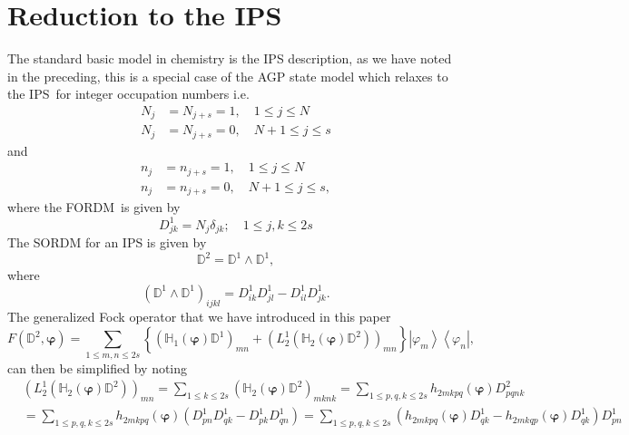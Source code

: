 \documentclass[aps,preprint]{revtex4}%
\begin{document}
\section{Reduction to the IPS \label{IPS}}

The standard basic model in chemistry is the IPS description, as we have noted
in the preceding, this is a special case of the AGP state model which relaxes
to the IPS\ for integer occupation numbers i.e.
\begin{align}
N_{j}  &  =N_{j+s}=1,\quad1\leq j\leq N\nonumber\\
N_{j}  &  =N_{j+s}=0,\quad N+1\leq j\leq s
\end{align}
and%
\begin{align}
n_{j}  &  =n_{j+s}=1,\quad1\leq j\leq N\nonumber\\
n_{j}  &  =n_{j+s}=0,\quad N+1\leq j\leq s,
\end{align}
where the FORDM\ is given by
\begin{equation}
D_{jk}^{1}=N_{j}\delta_{jk};\quad1\leq j,k\leq2s
\end{equation}
The SORDM for an IPS is given by
\begin{equation}
\mathbb{D}^{2}=\mathbb{D}^{1}\wedge\mathbb{D}^{1},
\end{equation}
where
\begin{equation}
\left(  \mathbb{D}^{1}\wedge\mathbb{D}^{1}\right)  _{ijkl}=D_{ik}^{1}%
D_{jl}^{1}-D_{il}^{1}D_{jk}^{1}.
\end{equation}
The generalized Fock operator that we have introduced in this paper
\begin{equation}
F\left(  \mathbb{D}^{2},\mathbf{\varphi}\right)  =\sum_{1\leq m,n\leq
2s}\left\{  \left(  \mathbb{H}_{1}\left(  \mathbf{\varphi}\right)
\mathbb{D}^{1}\right)  _{mn}+\left(  L_{2}^{1}\left(  \mathbb{H}_{2}\left(
\mathbf{\varphi}\right)  \mathbb{D}^{2}\right)  \right)  _{mn}\right\}
\left\vert \varphi_{m}\right\rangle \left\langle \varphi_{n}\right\vert ,
\label{F1}%
\end{equation}
can then be simplified by noting
\begin{align}
&  \left(  L_{2}^{1}\left(  \mathbb{H}_{2}\left(  \mathbf{\varphi}\right)
\mathbb{D}^{2}\right)  \right)  _{mn}=\sum_{1\leq k\leq2s}\left(
\mathbb{H}_{2}\left(  \mathbf{\varphi}\right)  \mathbb{D}^{2}\right)
_{mknk}=\sum_{1\leq p,q,k\leq2s}h_{2mkpq}\left(  \mathbf{\varphi}\right)
D_{pqnk}^{2}\nonumber\\
&  =\sum_{1\leq p,q,k\leq2s}h_{2mkpq}\left(  \mathbf{\varphi}\right)  \left(
D_{pn}^{1}D_{qk}^{1}-D_{pk}^{1}D_{qn}^{1}\right)  =\sum_{1\leq p,q,k\leq
2s}\left(  h_{2mkpq}\left(  \mathbf{\varphi}\right)  D_{qk}^{1}-h_{2mkqp}%
\left(  \mathbf{\varphi}\right)  D_{qk}^{1}\right)  D_{pn}^{1}%
\end{align}
\end{document}
